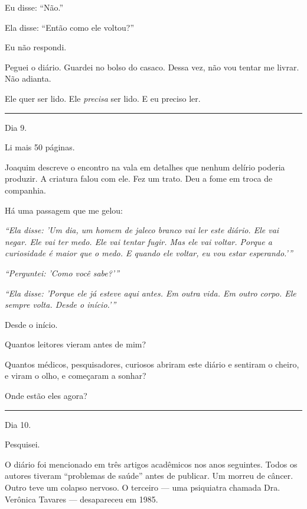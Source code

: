 \noindent Eu disse: \textquotedblleft{}Não.\textquotedblright{}

\noindent Ela disse: \textquotedblleft{}Então como ele voltou?\textquotedblright{}

\noindent Eu não respondi.

\noindent Peguei o diário. Guardei no bolso do casaco. Dessa vez, não vou tentar me livrar. Não adianta.

\noindent Ele quer ser lido.
Ele \textit{precisa} ser lido.
E eu preciso ler.

\vspace{0.5em}\noindent\rule{\textwidth}{0.5pt}\vspace{0.5em}

\noindent Dia 9.

\noindent Li mais 50 páginas.

\noindent Joaquim descreve o encontro na vala em detalhes que nenhum delírio poderia produzir. A criatura falou com ele. Fez um trato. Deu a fome em troca de companhia.

\noindent Há uma passagem que me gelou:

\noindent \textit{\textquotedblleft{}Ela disse: 'Um dia, um homem de jaleco branco vai ler este diário. Ele vai negar. Ele vai ter medo. Ele vai tentar fugir. Mas ele vai voltar. Porque a curiosidade é maior que o medo. E quando ele voltar, eu vou estar esperando.'\textquotedblright{}}

\noindent \textit{\textquotedblleft{}Perguntei: 'Como você sabe?'\textquotedblright{}}

\noindent \textit{\textquotedblleft{}Ela disse: 'Porque ele já esteve aqui antes. Em outra vida. Em outro corpo. Ele sempre volta. Desde o início.'\textquotedblright{}}

\noindent Desde o início.

\noindent Quantos leitores vieram antes de mim?

\noindent Quantos médicos, pesquisadores, curiosos abriram este diário e sentiram o cheiro, e viram o olho, e começaram a sonhar?

\noindent Onde estão eles agora?

\vspace{0.5em}\noindent\rule{\textwidth}{0.5pt}\vspace{0.5em}

\noindent Dia 10.

\noindent Pesquisei.

\noindent O diário foi mencionado em três artigos acadêmicos nos anos seguintes. Todos os autores tiveram \textquotedblleft{}problemas de saúde\textquotedblright{} antes de publicar. Um morreu de câncer. Outro teve um colapso nervoso. O terceiro --- uma psiquiatra chamada Dra. Verônica Tavares --- desapareceu em 1985.

